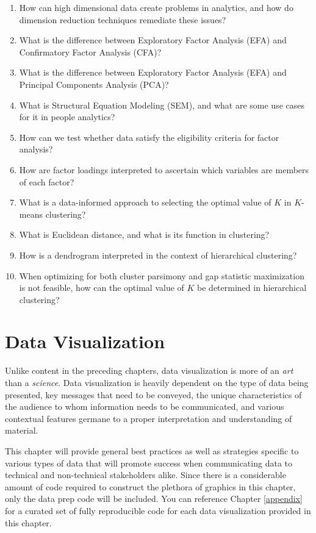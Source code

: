 \documentclass[
]{book}
\begin{document}
\begin{enumerate}
\def\labelenumi{\arabic{enumi}.}
\item
  How can high dimensional data create problems in analytics, and how do dimension reduction techniques remediate these issues?
\item
  What is the difference between Exploratory Factor Analysis (EFA) and Confirmatory Factor Analysis (CFA)?
\item
  What is the difference between Exploratory Factor Analysis (EFA) and Principal Components Analysis (PCA)?
\item
  What is Structural Equation Modeling (SEM), and what are some use cases for it in people analytics?
\item
  How can we test whether data satisfy the eligibility criteria for factor analysis?
\item
  How are factor loadings interpreted to ascertain which variables are members of each factor?
\item
  What is a data-informed approach to selecting the optimal value of \(K\) in \(K\)-means clustering?
\item
  What is Euclidean distance, and what is its function in clustering?
\item
  How is a dendrogram interpreted in the context of hierarchical clustering?
\item
  When optimizing for both cluster parsimony and gap statistic maximization is not feasible, how can the optimal value of \(K\) be determined in hierarchical clustering?
\end{enumerate}

\hypertarget{data-viz}{%
\chapter{Data Visualization}\label{data-viz}}

Unlike content in the preceding chapters, data visualization is more of an \emph{art} than a \emph{science}. Data visualization is heavily dependent on the type of data being presented, key messages that need to be conveyed, the unique characteristics of the audience to whom information needs to be communicated, and various contextual features germane to a proper interpretation and understanding of material.

This chapter will provide general best practices as well as strategies specific to various types of data that will promote success when communicating data to technical and non-technical stakeholders alike. Since there is a considerable amount of code required to construct the plethora of graphics in this chapter, only the data prep code will be included. You can reference Chapter \ref{appendix} for a curated set of fully reproducible code for each data visualization provided in this chapter.
\end{document}
